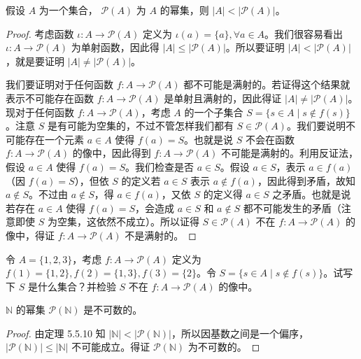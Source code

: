 \begin{theorem}
假设 $A$ 为一个集合， $\mathcal{P}(A)$ 为 $A$ 的幂集，则 $|A| < |\mathcal{P}(A)|$。
\end{theorem}

\begin{proof}
考虑函数 $\iota : A \to \mathcal{P}(A)$ 定义为 $\iota(a) = \{a\}, \forall a \in A$。我们很容易看出 $\iota : A \to \mathcal{P}(A)$ 为单射函数，因此得 $|A| \leq |\mathcal{P}(A)|$。所以要证明 $|A| < |\mathcal{P}(A)|$，就是要证明 $|A| \neq |\mathcal{P}(A)|$。

我们要证明对于任何函数 $f : A \to \mathcal{P}(A)$ 都不可能是满射的。若证得这个结果就表示不可能存在函数 $f : A \to \mathcal{P}(A)$ 是单射且满射的，因此得证 $|A| \neq |\mathcal{P}(A)|$。现对于任何函数 $f : A \to \mathcal{P}(A)$，考虑 $A$ 的一个子集合 $S = \{s \in A \mid s \notin f(s)\}$。注意 $S$ 是有可能为空集的，不过不管怎样我们都有 $S \in \mathcal{P}(A)$。我们要说明不可能存在一个元素 $a \in A$ 使得 $f(a) = S$。也就是说 $S$ 不会在函数 $f : A \to \mathcal{P}(A)$ 的像中，因此得到 $f : A \to \mathcal{P}(A)$ 不可能是满射的。利用反证法，假设 $a \in A$ 使得 $f(a) = S$。我们检查是否 $a \in S$。假设 $a \in S$，表示 $a \in f(a)$（因 $f(a) = S$），但依 $S$ 的定义若 $a \in S$ 表示 $a \notin f(a)$，因此得到矛盾，故知 $a \notin S$。不过由 $a \notin S$，得 $a \in f(a)$，又依 $S$ 的定义得 $a \in S$ 之矛盾。也就是说若存在 $a \in A$ 使得 $f(a) = S$，会造成 $a \in S$ 和 $a \notin S$ 都不可能发生的矛盾（注意即使 $S$ 为空集，这依然不成立）。所以证得 $S \in \mathcal{P}(A)$ 不在 $f : A \to \mathcal{P}(A)$ 的像中，得证 $f : A \to \mathcal{P}(A)$ 不是满射的。
\end{proof}

\begin{question}
令 $A = \{1, 2, 3\}$，考虑 $f : A \to \mathcal{P}(A)$ 定义为 $f(1) = \{1, 2\}, f(2) = \{1, 3\}, f(3) = \{2\}$。令 $S = \{s \in A \mid s \notin f(s)\}$。试写下 $S$ 是什么集合？并检验 $S$ 不在 $f : A \to \mathcal{P}(A)$ 的像中。
\end{question}

\begin{corollary}
$\mathbb{N}$ 的幂集 $\mathcal{P}(\mathbb{N})$ 是不可数的。
\end{corollary}

\begin{proof}
由定理 5.5.10 知 $|\mathbb{N}| < |\mathcal{P}(\mathbb{N})|$，所以因基数之间是一个偏序，$|\mathcal{P}(\mathbb{N})| \leq |\mathbb{N}|$ 不可能成立。得证 $\mathcal{P}(\mathbb{N})$ 为不可数的。
\end{proof}

